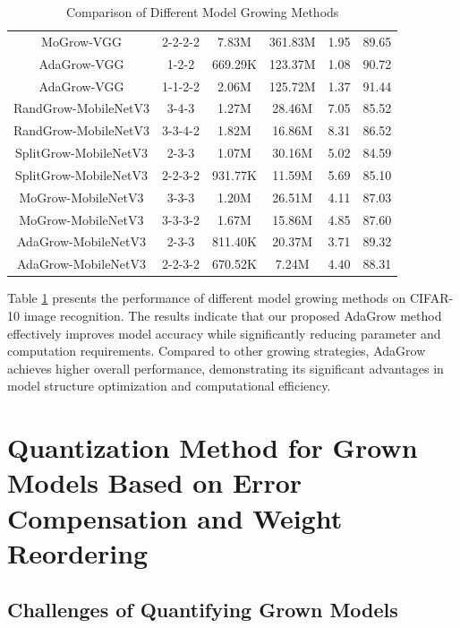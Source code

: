 \documentclass[preprint,12pt]{elsarticle}
\begin{document}
\begin{table}[ht]
\begin{adjustbox}{center}
\begin{tabular}{c|c|c|c|c|c}
MoGrow-VGG & 2-2-2-2 & 7.83M & 361.83M & 1.95 & 89.65 \\
AdaGrow-VGG & 1-2-2 & 669.29K & 123.37M & 1.08 & 90.72 \\
AdaGrow-VGG & 1-1-2-2 & 2.06M & 125.72M & 1.37 & 91.44 \\
RandGrow-MobileNetV3 & 3-4-3 & 1.27M & 28.46M & 7.05 & 85.52 \\
RandGrow-MobileNetV3 & 3-3-4-2 & 1.82M & 16.86M & 8.31 & 86.52 \\
SplitGrow-MobileNetV3 & 2-3-3 & 1.07M & 30.16M & 5.02 & 84.59 \\
SplitGrow-MobileNetV3 & 2-2-3-2 & 931.77K & 11.59M & 5.69 & 85.10 \\
MoGrow-MobileNetV3 & 3-3-3 & 1.20M & 26.51M & 4.11 & 87.03 \\
MoGrow-MobileNetV3 & 3-3-3-2 & 1.67M & 15.86M & 4.85 & 87.60 \\
AdaGrow-MobileNetV3 & 2-3-3 & 811.40K & 20.37M & 3.71 & 89.32 \\
AdaGrow-MobileNetV3 & 2-2-3-2 & 670.52K & 7.24M & 4.40 & 88.31 \\
\hline
\end{tabular}
\end{adjustbox}
\caption{Comparison of Different Model Growing Methods}
\label{table:model_growing_comparison}
\end{table}

Table \ref{table:model_growing_comparison} presents the performance of different model growing methods on CIFAR-10 image recognition. The results indicate that our proposed AdaGrow method effectively improves model accuracy while significantly reducing parameter and computation requirements. Compared to other growing strategies, AdaGrow achieves higher overall performance, demonstrating its significant advantages in model structure optimization and computational efficiency.

\section{Quantization Method for Grown Models Based on Error Compensation and Weight Reordering}

\subsection{Challenges of Quantifying Grown Models}\label{challenge}
\end{document}
